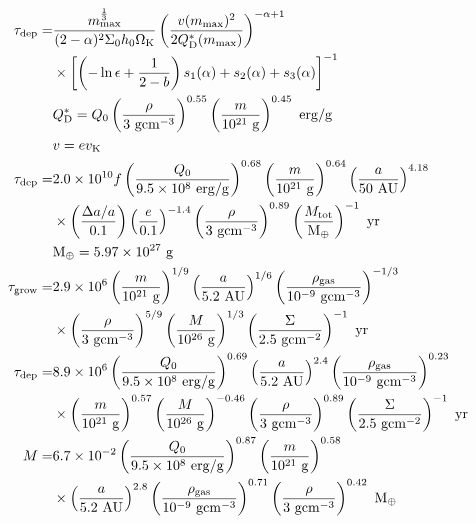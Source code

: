 \documentclass[11pt,a4paper,oneside,onecolumn]{jreport}
\begin{document}
\begin{align}
 \tau_{\rm dep} =& \frac{m_{\rm max}^{\frac{1}{3}}}{(2-\alpha)^2\Sigma_0h_0\Omega_{\rm K}} \left( \frac{v(m_{\rm max})^2}{2Q_{\rm D}^{\ast}(m_{\rm max})} \right)^{-\alpha+1}\\
 &\times \left[ \left(- \ln \epsilon + \frac{1}{2 - b} \right) s_1(\alpha) + s_2(\alpha) + s_3(\alpha) \right]^{-1}\\
 &Q_{\rm D}^{\ast} = Q_0 \left( \frac{\rho}{3\ {\rm g cm^{-3}}} \right)^{0.55} \left( \frac{m}{10^{21}\ {\rm g}} \right)^{0.45}\ {\rm erg/g}\\
 &v = e v_{\rm K}\\
 \tau_{\rm dep} =& 2.0 \times 10^{10}f \left( \frac{Q_0}{9.5 \times 10^8\ {\rm erg/g}} \right)^{0.68} \left( \frac{m}{10^{21}\ {\rm g}} \right)^{0.64} \left( \frac{a}{50\ {\rm AU}} \right)^{4.18}\\
 &\times \left( \frac{\Delta a/a}{0.1} \right) \left( \frac{e}{0.1} \right)^{-1.4} \left( \frac{\rho}{3\ {\rm g cm^{-3}}} \right)^{0.89} \left( \frac{M_{\rm tot}}{{\rm M_{\oplus}}} \right)^{-1}\ {\rm yr}\\
 &{\rm M_{\oplus}} = 5.97 \times 10^{27}\ {\rm g}\\
 \tau_{\rm grow} =& 2.9 \times 10^6 \left( \frac{m}{10^{21}\ {\rm g}} \right)^{1/9} \left( \frac{a}{5.2\ {\rm AU}} \right)^{1/6} \left( \frac{\rho_{\rm gas}}{10^{-9}\ {\rm g cm^{-3}}} \right)^{-1/3}\\
 &\times \left( \frac{\rho}{3\ {\rm g cm^{-3}}} \right)^{5/9} \left( \frac{M}{10^{26}\ {\rm g}} \right)^{1/3} \left( \frac{\Sigma}{2.5\ {\rm g cm^{-2}}} \right)^{-1}\ {\rm yr}\\
 \tau_{\rm dep} =& 8.9 \times 10^6 \left( \frac{Q_0}{9.5 \times 10^8\ {\rm erg/g}} \right)^{0.69} \left( \frac{a}{5.2\ {\rm AU}} \right)^{2.4} \left( \frac{\rho_{\rm gas}}{10^{-9}\ {\rm g cm^{-3}}} \right)^{0.23}\\
 &\times \left( \frac{m}{10^{21}\ {\rm g}} \right)^{0.57} \left( \frac{M}{10^{26}\ {\rm g}} \right)^{-0.46} \left( \frac{\rho}{3\ {\rm gcm^{-3}}} \right)^{0.89} \left( \frac{\Sigma}{2.5\ {\rm g cm^{-2}}} \right)^{-1}\ {\rm yr}\\
 M =& 6.7 \times 10^{-2} \left( \frac{Q_0}{9.5 \times 10^8\ {\rm erg/g}} \right)^{0.87} \left( \frac{m}{10^{21}\ {\rm g}} \right)^{0.58}\\ 
 &\times \left( \frac{a}{5.2\ {\rm AU}} \right)^{2.8} \left( \frac{\rho_{\rm gas}}{10^{-9}\ {\rm g cm^{-3}}} \right)^{0.71} \left( \frac{\rho}{3\ {\rm g cm^{-3}}} \right)^{0.42}\ {\rm M_{\oplus}}
\end{align}
 
\end{document}
